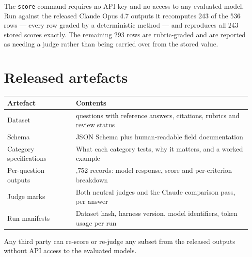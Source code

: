 \documentclass[11pt,a4paper]{article}
\begin{document}
The \texttt{score} command requires no API key and no access to any evaluated model. Run against the released Claude Opus 4.7 outputs it recomputes 243 of the 536 rows --- every row graded by a deterministic method --- and reproduces all 243 stored scores exactly. The remaining 293 rows are rubric-graded and are reported as needing a judge rather than being carried over from the stored value.

\section{Released artefacts}

\begin{center}
\small
\begin{tabularx}{\textwidth}{l>{\raggedright\arraybackslash}X}
\toprule
Artefact & Contents \\
\midrule
Dataset & 536 questions with reference answers, citations, rubrics and review status \\
Schema & JSON Schema plus human-readable field documentation \\
Category specifications & What each category tests, why it matters, and a worked example \\
Per-question outputs & 3,752 records: model response, score and per-criterion breakdown \\
Judge marks & Both neutral judges and the Claude comparison pass, per answer \\
Run manifests & Dataset hash, harness version, model identifiers, token usage per run \\
\bottomrule
\end{tabularx}
\end{center}

Any third party can re-score or re-judge any subset from the released outputs without API access to the evaluated models.
\end{document}
